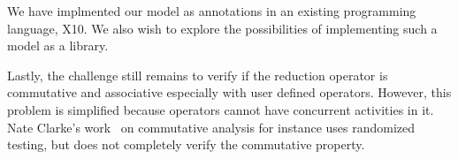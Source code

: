 \documentclass[10pt, conference, compsocconf]{IEEEtran}
\begin{document}
We have implmented our model as annotations in an existing
programming language, X10.
We also wish to explore the possibilities of implementing such a model
as a library.

Lastly, the challenge still remains to verify if the reduction operator
is commutative and associative especially with user defined operators.
However, this problem is simplified because operators cannot
have concurrent activities in it.
Nate Clarke's work~\cite{aleen2009commutativity} on commutative
analysis for instance uses randomized testing, but does not completely
verify the commutative property.





\end{document}
